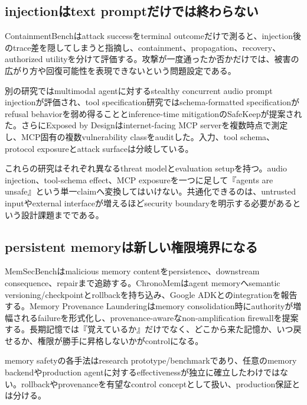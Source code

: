 \subsection{injectionはtext promptだけでは終わらない}

ContainmentBenchはattack successをterminal outcomeだけで測ると、injection後のtrace差を隠してしまうと指摘し、containment、propagation、recovery、authorized utilityを分けて評価する。攻撃が一度通ったか否かだけでは、被害の広がり方や回復可能性を表現できないという問題設定である。\autocite{src-e08216aa168c}


別の研究ではmultimodal agentに対するstealthy concurrent audio prompt injectionが評価され、tool specification研究ではschema-formatted specificationがrefusal behaviorを弱め得ることとinference-time mitigationのSafeKeepが提案された。さらにExposed by Designはinternet-facing MCP serverを複数時点で測定し、MCP固有の複数vulnerability classをauditした。入力、tool schema、protocol exposureとattack surfaceは分岐している。\autocite{src-0ebd2e2bdbb7,src-62c4ed3c6c14,src-65271d0e1d0b}


\begin{claimboundary}
これらの研究はそれぞれ異なるthreat modelとevaluation setupを持つ。audio injection、tool-schema effect、MCP exposureを一つに足して『agents are unsafe』という単一claimへ変換してはいけない。共通化できるのは、untrusted inputやexternal interfaceが増えるほどsecurity boundaryを明示する必要があるという設計課題までである。\autocite{src-0ebd2e2bdbb7,src-62c4ed3c6c14,src-65271d0e1d0b,src-e08216aa168c}
\end{claimboundary}

\subsection{persistent memoryは新しい権限境界になる}

MemSecBenchはmalicious memory contentをpersistence、downstream consequence、repairまで追跡する。ChronoMemはagent memoryへsemantic versioning/checkpointとrollbackを持ち込み、Google ADKとのintegrationを報告する。Memory Provenance Launderingはmemory consolidation時にauthorityが増幅されるfailureを形式化し、provenance-awareなnon-amplification firewallを提案する。長期記憶では『覚えているか』だけでなく、どこから来た記憶か、いつ戻せるか、権限が勝手に昇格しないかがcontrolになる。\autocite{src-021c5e6be64a,src-1eac9e55bab6,src-732b15b19744}


\begin{claimboundary}
memory safetyの各手法はresearch prototype/benchmarkであり、任意のmemory backendやproduction agentに対するeffectivenessが独立に確立したわけではない。rollbackやprovenanceを有望なcontrol conceptとして扱い、production保証とは分ける。\autocite{src-021c5e6be64a,src-1eac9e55bab6,src-732b15b19744}
\end{claimboundary}

